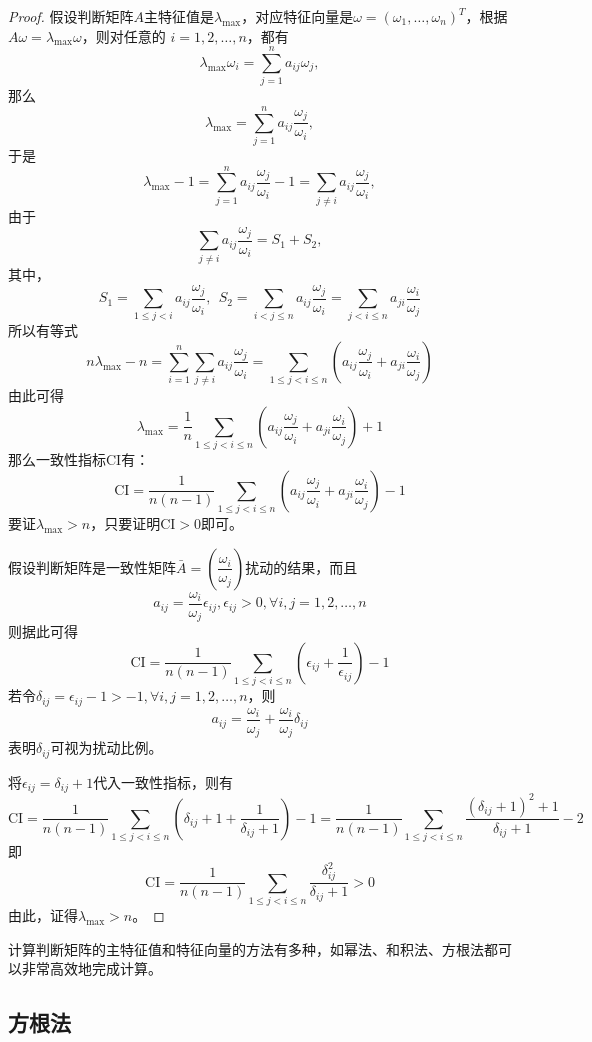 \begin{proof}
假设判断矩阵$A$主特征值是$\lambda_{\max}$，对应特征向量是$\omega = (\omega_1,\ldots,\omega_n)^T$，根据$A\omega = \lambda_{\max}\omega$，则对任意的
$i=1,2,\ldots,n$，都有
\[\lambda_{\max}\omega_i = \sum_{j=1}^n{a_{ij}\omega_j},\]
那么
\[\lambda_{\max}=\sum_{j=1}^n{a_{ij}\frac{\omega_j}{\omega_i}},\]
于是
\[\lambda_{\max}-1=\sum_{j=1}^n{a_{ij}\frac{\omega_j}{\omega_i}}-1=\sum_{j\neq i}{a_{ij}\frac{\omega_j}{\omega_i}},\]
由于
\[\sum_{j\neq i}{a_{ij}\frac{\omega_j}{\omega_i}}=S_1 + S_2,\]
其中，
\[
    S_1 = \sum_{1\le j< i}{a_{ij}\frac{\omega_j}{\omega_i}},~~S_2 = \sum_{i< j\le n}{a_{ij}\frac{\omega_j}{\omega_i}} = \sum_{j< i\le n}{a_{ji}\frac{\omega_i}{\omega_j}}
\]
所以有等式
\[n\lambda_{\max}-n=\sum_{i=1}^n{\sum_{j\neq i}{a_{ij}\frac{\omega_j}{\omega_i}}}=\sum_{1\le j<i\le n}({a_{ij}\frac{\omega_j}{\omega_i} + a_{ji}\frac{\omega_i}{\omega_j}})\]
由此可得
\[\lambda_{\max} = \frac{1}{n}\sum_{1\le j<i\le n}({a_{ij}\frac{\omega_j}{\omega_i} + a_{ji}\frac{\omega_i}{\omega_j}}) + 1\]
那么一致性指标$\mathrm{CI}$有：
\[
    \mathrm{CI} = \frac{1}{n(n-1)}\sum_{1\le j<i\le n}({a_{ij}\frac{\omega_j}{\omega_i} + a_{ji}\frac{\omega_i}{\omega_j}}) - 1
\]
要证$\lambda_{\max}>n$，只要证明$\mathrm{CI}>0$即可。

假设判断矩阵是一致性矩阵$\bar A=(\dfrac{\omega_i}{\omega_j})$扰动的结果，而且
\[
    a_{ij} = \frac{\omega_i}{\omega_j}\epsilon_{ij},\epsilon_{ij}>0,\forall i,j=1,2,\ldots,n
\]
则据此可得
\[
    \mathrm{CI} = \frac{1}{n(n-1)}\sum_{1\le j<i\le n}(\epsilon_{ij} + \frac{1}{\epsilon_{ij}}) - 1
\]
若令$\delta_{ij}=\epsilon_{ij}-1>-1,\forall i,j=1,2,\ldots,n$，则
\[
    a_{ij} = \frac{\omega_i}{\omega_j} + \frac{\omega_i}{\omega_j}\delta_{ij}
\]
表明$\delta_{ij}$可视为扰动比例。

将$\epsilon_{ij}=\delta_{ij}+1$代入一致性指标，则有
\[
    \mathrm{CI} = \frac{1}{n(n-1)}\sum_{1\le j<i\le n}(\delta_{ij} + 1 + \frac{1}{\delta_{ij}+1}) - 1=\frac{1}{n(n-1)}\sum_{1\le j<i\le n}{\frac{(\delta_{ij}+1)^2+1}{\delta_{ij}+1}-2}
\]
即
\[
    \mathrm{CI} = \frac{1}{n(n-1)}\sum_{1\le j<i\le n}{\frac{\delta_{ij}^2}{\delta_{ij}+1}}>0
\]
由此，证得$\lambda_{\max}>n$。\qedhere
\end{proof}

计算判断矩阵的主特征值和特征向量的方法有多种，如幂法、和积法、方根法都可以非常高效地完成计算。

\subsection{方根法}

